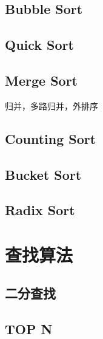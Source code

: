 \subsection{Bubble Sort}

\subsection{Quick Sort}

\subsection{Merge Sort}

归并，多路归并，外排序

\subsection{Counting Sort}

\subsection{Bucket Sort}

\subsection{Radix Sort}

\section{查找算法}

\subsection{二分查找}

\subsection{TOP N}

